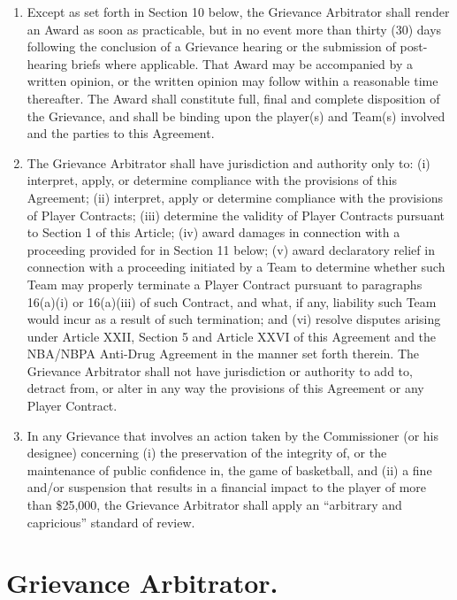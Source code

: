 \documentclass[
]{book}
\providecommand{\tightlist}{%
  \setlength{\itemsep}{0pt}\setlength{\parskip}{0pt}}
\begin{document}
\begin{enumerate}
\def\labelenumi{(\alph{enumi})}
\tightlist
\item
  Except as set forth in Section 10 below, the Grievance Arbitrator shall render an Award as soon as practicable, but in no event more than thirty (30) days following the conclusion of a Grievance hearing or the submission of post-hearing briefs where applicable. That Award may be accompanied by a written opinion, or the written opinion may follow within a reasonable time thereafter. The Award shall constitute full, final and complete disposition of the Grievance, and shall be binding upon the player(s) and Team(s) involved and the parties to this Agreement.
\item
  The Grievance Arbitrator shall have jurisdiction and authority only to: (i) interpret, apply, or determine compliance with the provisions of this Agreement; (ii) interpret, apply or determine compliance with the provisions of Player Contracts; (iii) determine the validity of Player Contracts pursuant to Section 1 of this Article; (iv) award damages in connection with a proceeding provided for in Section 11 below; (v) award declaratory relief in connection with a proceeding initiated by a Team to determine whether such Team may properly terminate a Player Contract pursuant to paragraphs 16(a)(i) or 16(a)(iii) of such Contract, and what, if any, liability such Team would incur as a result of such termination; and (vi) resolve disputes arising under Article XXII, Section 5 and Article XXVI of this Agreement and the NBA/NBPA Anti-Drug Agreement in the manner set forth therein. The Grievance Arbitrator shall not have jurisdiction or authority to add to, detract from, or alter in any way the provisions of this Agreement or any Player Contract.
\item
  In any Grievance that involves an action taken by the Commissioner (or his designee) concerning (i) the preservation of the integrity of, or the maintenance of public confidence in, the game of basketball, and (ii) a fine and/or suspension that results in a financial impact to the player of more than \$25,000, the Grievance Arbitrator shall apply an ``arbitrary and capricious'' standard of review.
\end{enumerate}

\hypertarget{grievance-arbitrator.}{%
\section{Grievance Arbitrator.}\label{grievance-arbitrator.}}
\end{document}
